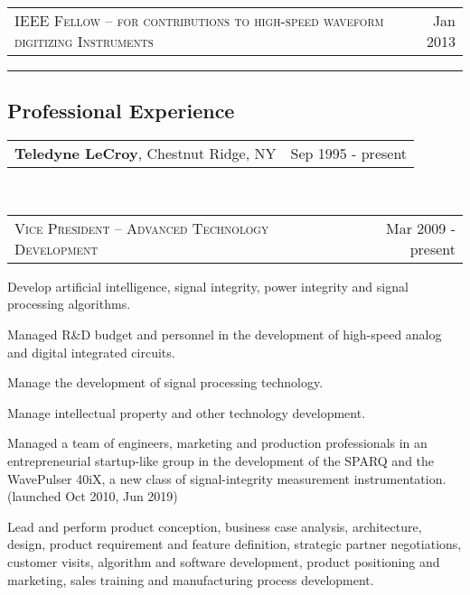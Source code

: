 \documentclass[10pt,letterpaper]{extarticle}
\makeatletter
\newcommand{\headerrow}[2]
{\begin{tabular*}{\linewidth}{l@{\extracolsep{\fill}}r}
	#1 &
	#2 \\
\end{tabular*}}
\makeatother
\begin{document}
	\item[]
	\headerrow
		{\large \textsc{IEEE Fellow -- for contributions to high-speed waveform digitizing Instruments}}
		{Jan 2013}
\hrule
\vspace{-1em}\subsection*{\Large Professional Experience}\vspace{-0.5em}
	\headerrow
		{\large \textbf{Teledyne LeCroy}, Chestnut Ridge, NY}
		{Sep 1995 - present}
	\\
	\headerrow
		{\large \textsc{Vice President – Advanced Technology Development}}
		{Mar 2009 - present}\vspace{-\topsep}\begin{itemize*}
		\item Develop artificial intelligence, signal integrity, power integrity and signal processing algorithms.
		\item Managed R\&D budget and personnel in the development of high-speed analog and digital integrated circuits.
		\item Manage the development of signal processing technology.
		\item Manage intellectual property and other technology development.
		\item Managed a team of engineers, marketing and production professionals in an
		entrepreneurial startup-like group in the development of the SPARQ and the WavePulser 40iX, a new class of 
		signal-integrity measurement instrumentation. (launched Oct 2010, Jun 2019)
		\item Lead and perform product conception, business case analysis, architecture,
		design, product requirement and feature definition, strategic partner negotiations, 
		customer visits, algorithm and software development, product positioning and 
		marketing, sales training and manufacturing process development. 
	\end{itemize*}\vspace{-\topsep}
\end{document}
